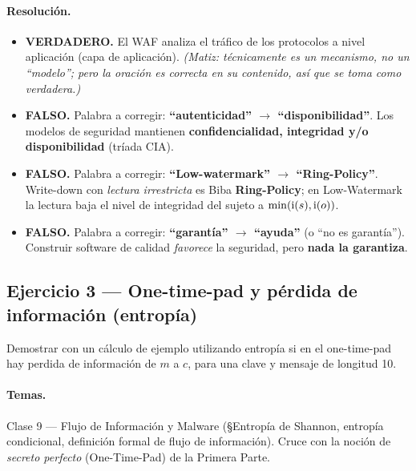\paragraph{Resolución.}
\begin{itemize}
  \item[a)] \textbf{VERDADERO.} El WAF analiza el tráfico de los protocolos a nivel
            aplicación (capa de aplicación). \emph{(Matiz: técnicamente es un mecanismo, no un
            ``modelo''; pero la oración es correcta en su contenido, así que se toma como
            verdadera.)}
  \item[b)] \textbf{FALSO.} Palabra a corregir: \textbf{``autenticidad'' $\rightarrow$
            ``disponibilidad''}. Los modelos de seguridad mantienen \textbf{confidencialidad,
            integridad y/o disponibilidad} (tríada CIA).
  \item[c)] \textbf{FALSO.} Palabra a corregir: \textbf{``Low-watermark'' $\rightarrow$
            ``Ring-Policy''}. Write-down con \emph{lectura irrestricta} es Biba
            \textbf{Ring-Policy}; en Low-Watermark la lectura baja el nivel de integridad del
            sujeto a $\min(\mathrm{i}(s),\mathrm{i}(o))$.
  \item[d)] \textbf{FALSO.} Palabra a corregir: \textbf{``garantía'' $\rightarrow$ ``ayuda''}
            (o ``no es garantía''). Construir software de calidad \emph{favorece} la seguridad,
            pero \textbf{nada la garantiza}.
\end{itemize}

\subsection{Ejercicio 3 — One-time-pad y pérdida de información (entropía)}

\begin{consigna}
Demostrar con un cálculo de ejemplo utilizando entropía si en el one-time-pad hay perdida de
información de $m$ a $c$, para una clave y mensaje de longitud 10.
\end{consigna}

\paragraph{Temas.}
Clase 9 — Flujo de Información y Malware (\S Entropía de Shannon, entropía condicional,
definición formal de flujo de información). Cruce con la noción de \emph{secreto perfecto}
(One-Time-Pad) de la Primera Parte.

